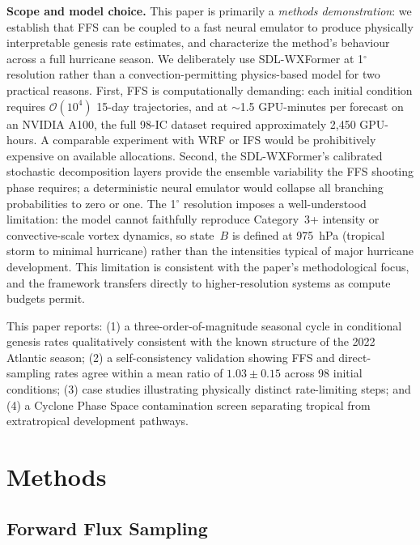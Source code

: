 \documentclass[11pt]{article}
\begin{document}
\textbf{Scope and model choice.}
This paper is primarily a \textit{methods demonstration}: we establish that FFS can be
coupled to a fast neural emulator to produce physically interpretable genesis rate
estimates, and characterize the method's behaviour across a full hurricane season.
We deliberately use SDL-WXFormer at 1$^\circ$ resolution rather than a convection-permitting
physics-based model for two practical reasons. First, FFS is computationally demanding:
each initial condition requires $\mathcal{O}(10^4)$ 15-day trajectories, and at
$\sim$1.5 GPU-minutes per forecast on an NVIDIA A100, the full 98-IC dataset required
approximately 2,450 GPU-hours. A comparable experiment with WRF or IFS would be
prohibitively expensive on available allocations. Second, the SDL-WXFormer's calibrated
stochastic decomposition layers provide the ensemble variability the FFS shooting phase
requires; a deterministic neural emulator would collapse all branching probabilities to
zero or one. The 1$^\circ$ resolution imposes a well-understood limitation: the model
cannot faithfully reproduce Category~3+ intensity or convective-scale vortex dynamics,
so state~$B$ is defined at 975~hPa (tropical storm to minimal hurricane) rather than
the intensities typical of major hurricane development. This limitation is consistent
with the paper's methodological focus, and the framework transfers directly to
higher-resolution systems as compute budgets permit.

This paper reports: (1) a three-order-of-magnitude seasonal cycle in conditional genesis
rates qualitatively consistent with the known structure of the 2022 Atlantic season; (2) a self-consistency
validation showing FFS and direct-sampling rates agree within a mean ratio of
$1.03\pm0.15$ across 98 initial conditions; (3) case studies illustrating physically
distinct rate-limiting steps; and (4) a Cyclone Phase Space contamination screen
separating tropical from extratropical development pathways.

\section{Methods}

\subsection{Forward Flux Sampling}
\end{document}

